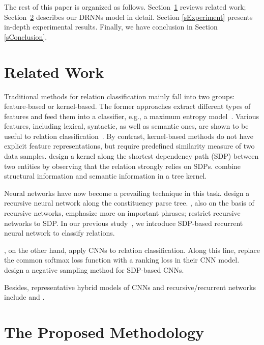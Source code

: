 \documentclass[11pt]{article}
\begin{document}
The rest of this paper is organized as follows. Section~\ref{sRelatedwork} reviews related work; Section~\ref{sModel} describes our DRNNs model in detail. Section \ref{sExperiment} presents in-depth experimental results. Finally, we have conclusion in Section \ref{sConclusion}.



\section{Related Work}\label{sRelatedwork}

Traditional methods for relation classification mainly fall into two groups: feature-based or kernel-based. The former approaches extract different types of features and feed them into a classifier, e.g., a maximum entropy model~\cite{MaxEntRE}. Various features, including lexical, syntactic, as well as semantic ones, are shown to be useful to relation classification~\cite{2010SVM}. By contrast, kernel-based methods do not have explicit feature representations, but require predefined similarity measure of two data samples.  design a kernel along the shortest dependency path (SDP) between two entities by observing that the relation strongly relies on SDPs.
 combine structural information and semantic information in a tree kernel.


Neural networks have now become a prevailing technique in this task.
 design a recursive neural network along the constituency parse tree.
, also on the basis of recursive networks, emphasize more on important phrases;
 restrict recursive networks to SDP.
In our previous study~\cite{SDP-LSTM}, we introduce SDP-based recurrent neural network to classify relations.

, on the other hand, apply CNNs to relation classification.
Along this line,  replace the common softmax loss function with a ranking loss in their CNN model.
 design a negative sampling method for SDP-based CNNs.

Besides,  representative hybrid models of CNNs and recursive/recurrent networks include  and .



\section{The Proposed Methodology}\label{sModel}
\end{document}
